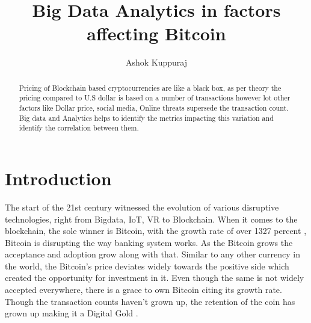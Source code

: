 \documentclass[sigconf]{acmart}
\begin{document}
\title{Big Data Analytics in factors affecting Bitcoin}


\author{Ashok Kuppuraj}


\renewcommand{\shortauthors}{G. v. Laszewski}


\begin{abstract}
Pricing of Blockchain based cryptocurrencies are like a black box, as per theory the pricing compared to U.S dollar is based on a number of transactions however lot other factors like Dollar price, social media, Online threats supersede the transaction count. Big data and Analytics helps to identify the metrics impacting this variation and identify the correlation between them.
\end{abstract}



\maketitle

\section{Introduction}
The start of the 21st century witnessed the evolution of various disruptive technologies, right from Bigdata, IoT, VR to Blockchain. When it comes to the blockchain, the sole winner is Bitcoin, with the growth rate of over 1327 percent \cite{coingrowth:online}, Bitcoin is disrupting the way banking system works. As the Bitcoin grows the acceptance and adoption grow along with that. Similar to any other currency in the world, the Bitcoin's price deviates widely towards the positive side which created the opportunity for investment in it. Even though the same is not widely accepted everywhere, there is a grace to own Bitcoin citing its growth rate. Though the transaction counts haven't grown up, the retention of the coin has grown up making it a Digital Gold \cite{Retain:online}.
\end{document}
